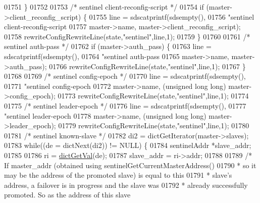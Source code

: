 \begin{DoxyCode}
{{{{{{{{{{{{{{{{{{{{{{{{01751         \}
01752 
01753         \textcolor{comment}{/* sentinel client-reconfig-script */}
01754         \textcolor{keywordflow}{if} (master->client\_reconfig\_script) \{
01755             line = sdscatprintf(sdsempty(),
01756                 \textcolor{stringliteral}{"sentinel client-reconfig-script %
01757                 master->name, master->client\_reconfig\_script);
01758             rewriteConfigRewriteLine(state,\textcolor{stringliteral}{"sentinel"},line,1);
01759         \}
01760 
01761         \textcolor{comment}{/* sentinel auth-pass */}
01762         \textcolor{keywordflow}{if} (master->auth\_pass) \{
01763             line = sdscatprintf(sdsempty(),
01764                 \textcolor{stringliteral}{"sentinel auth-pass %
01765                 master->name, master->auth\_pass);
01766             rewriteConfigRewriteLine(state,\textcolor{stringliteral}{"sentinel"},line,1);
01767         \}
01768 
01769         \textcolor{comment}{/* sentinel config-epoch */}
01770         line = sdscatprintf(sdsempty(),
01771             \textcolor{stringliteral}{"sentinel config-epoch %
01772             master->name, (\textcolor{keywordtype}{unsigned} \textcolor{keywordtype}{long} \textcolor{keywordtype}{long}) master->config\_epoch);
01773         rewriteConfigRewriteLine(state,\textcolor{stringliteral}{"sentinel"},line,1);
01774 
01775         \textcolor{comment}{/* sentinel leader-epoch */}
01776         line = sdscatprintf(sdsempty(),
01777             \textcolor{stringliteral}{"sentinel leader-epoch %
01778             master->name, (\textcolor{keywordtype}{unsigned} \textcolor{keywordtype}{long} \textcolor{keywordtype}{long}) master->leader\_epoch);
01779         rewriteConfigRewriteLine(state,\textcolor{stringliteral}{"sentinel"},line,1);
01780 
01781         \textcolor{comment}{/* sentinel known-slave */}
01782         di2 = dictGetIterator(master->slaves);
01783         \textcolor{keywordflow}{while}((de = dictNext(di2)) != NULL) \{
01784             sentinelAddr *slave\_addr;
01785 
01786             ri = \hyperlink{dict_8h_ae8d2cc391873b2bea2b87c4f80f43120}{dictGetVal}(de);
01787             slave\_addr = ri->addr;
01788 
01789             \textcolor{comment}{/* If master\_addr (obtained using sentinelGetCurrentMasterAddress()}
01790 \textcolor{comment}{             * so it may be the address of the promoted slave) is equal to this}
01791 \textcolor{comment}{             * slave's address, a failover is in progress and the slave was}
01792 \textcolor{comment}{             * already successfully promoted. So as the address of this slave}
}}}}}}}}}}}}}}}}}}}}}}}}}}}}
\end{DoxyCode}
